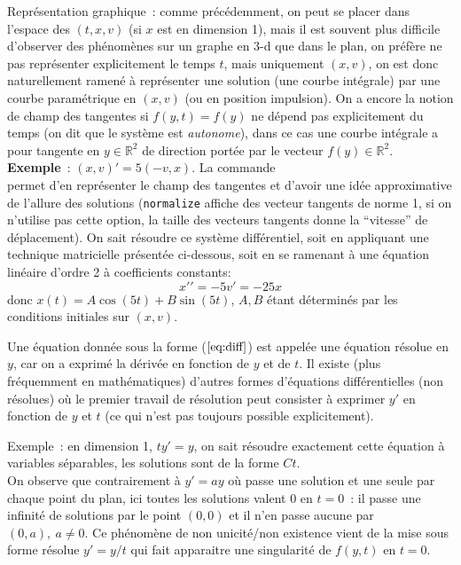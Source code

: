 \documentclass[a4paper,11pt]{book}
\begin{document}
\begin{giacjshere}
Repr\'esentation graphique~: comme pr\'ec\'edemment,
on peut se placer dans l'espace
des $(t,x,v)$ (si $x$ est en dimension 1), mais il est souvent
plus difficile d'observer des ph\'enom\`enes sur un graphe
en 3-d que dans le plan, on pr\'ef\`ere ne pas repr\'esenter explicitement le
temps $t$, mais uniquement $(x,v)$, on est donc naturellement
ramen\'e \`a repr\'esenter une solution (une courbe int\'egrale)
par une courbe param\'etrique en $(x,v)$ (ou en position
impulsion). On a encore la notion de champ des tangentes
si $f(y,t)=f(y)$ ne d\'epend pas explicitement du temps
(on dit que le syst\`eme est {\em autonome}), dans ce
cas une courbe int\'egrale a pour tangente en $y\in \mathbb{R}^2$ 
de direction port\'ee par le vecteur $f(y) \in \mathbb{R}^2$.\\
{\bf Exemple}~: $(x,v)'=5(-v,x)$. La commande \\
permet d'en repr\'esenter le champ des tangentes
et d'avoir une id\'ee approximative de l'allure des solutions
(\verb|normalize| affiche des vecteur tangents de norme 1, si
on n'utilise pas cette option, la taille des vecteurs tangents donne
la ``vitesse'' de d\'eplacement).
On sait r\'esoudre ce syst\`eme diff\'erentiel, soit en appliquant
une technique matricielle pr\'esent\'ee ci-dessous, 
soit en se ramenant \`a une \'equation
lin\'eaire d'ordre 2 \`a coefficients constants:
$$ x'{'}=-5v'=-25x$$
donc $x(t)=A\cos(5t)+B\sin(5t)$, $A, B$ \'etant d\'etermin\'es
par les conditions initiales sur $(x,v)$.

Une \'equation donn\'ee sous la forme (\(\ref{eq:diff}\))
est appel\'ee une \'equation r\'esolue en $y$,
car on a exprim\'e la d\'eriv\'ee en fonction de $y$ et de $t$. Il
existe (plus fr\'equemment en math\'ematiques) d'autres formes d'\'equations
diff\'erentielles (non r\'esolues) o\`u le premier travail de r\'esolution
peut consister \`a exprimer
$y'$ en fonction de $y$ et $t$ (ce qui n'est pas toujours possible 
explicitement).

Exemple~: en dimension 1, $ty'=y$, on sait r\'esoudre exactement
cette \'equation \`a variables s\'eparables, les solutions sont de la 
forme $Ct$.\\
On observe que contrairement \`a $y'=ay$
o\`u passe une solution et une seule par chaque point du plan,
ici toutes les solutions valent 0 en $t=0$~: il passe une
infinit\'e de solutions par le point $(0,0)$ et il n'en passe aucune
par $(0,a), \ a \neq 0$. Ce ph\'enom\`ene de non unicit\'e/non
existence vient de la mise sous forme r\'esolue $y'=y/t$ qui
fait apparaitre une singularit\'e de $f(y,t)$ en $t=0$.


\end{giacjshere}
\end{document}
